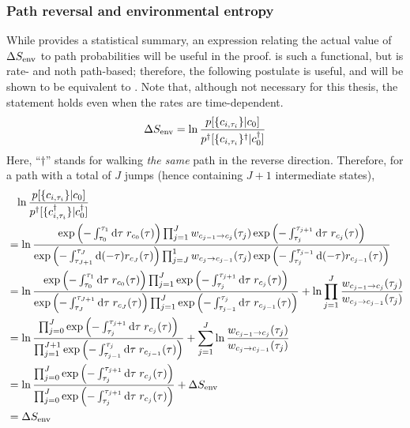 \subsubsection{Path reversal and environmental entropy}

While  provides a statistical summary, an expression relating the actual value of \(\Delta S_\text{env}\) to path probabilities will be useful in the proof.  is such a functional, but is rate- and noth path-based; therefore, the following postulate is useful, and will be shown to be equivalent to . Note that, although not necessary for this thesis, the statement holds even when the rates are time-dependent.
%
\begin{equation}
	\label{eqn:SEnv path functional}
	\Delta S_\text{env}
	= \ln\frac{p[\{c_{i,\tau_i}\}|c_0]}{p^\dagger[\{c_{i,\tau_i}\}^\dagger|c^\dagger_0]}
\end{equation}
%
Here, ``\(\dagger\)'' stands for walking \emph{the same} path in the reverse direction. Therefore, for a path with a total of \(J\) jumps (hence containing \(J+1\) intermediate states),
%
\begin{align*}
	&\phantom{=}
		\ln\frac{p[\{c_{i,\tau_i}\} | c_0]}{p^\dagger[\{c^\dagger_{i,\tau_i}\} | c_0^\dagger]}
	\\
	&=
		\ln\frac{
			\operatorname{exp}\left(-\int_{\tau_0}^{\tau_1}\mathrm{d}\tau\;r_{c_0}(\tau)\right)
			\prod_{j=1}^J
				w_{c_{j-1} \to c_j}(\tau_j)
				\operatorname{exp}\left(-\int_{\tau_j}^{\tau_{j+1}}\mathrm{d}\tau\;r_{c_j}(\tau)\right)
		}{
			\operatorname{exp}\left(-\int_{\tau_{J+1}}^{\tau_J}\mathrm{d}(-\tau)r_{c_J}(\tau)\right)
			\prod_{j=J}^1
				w_{c_j\to c_{j-1}}(\tau_j)
				\operatorname{exp}\left(-\int_{\tau_j}^{\tau_{j-1}}\mathrm{d}(-\tau)r_{c_{j-1}}(\tau)\right)
		}
	\\
	&=
		\ln\frac{
			\operatorname{exp}\left(-\int_{\tau_0}^{\tau_1}\mathrm{d}\tau\;r_{c_0}(\tau)\right)
			\prod_{j=1}^J
				\operatorname{exp}\left(-\int_{\tau_j}^{\tau_{j+1}}\mathrm{d}\tau\;r_{c_j}(\tau)\right)
		}{
			\operatorname{exp}\left(-\int_{\tau_J}^{\tau_{J+1}}\mathrm{d}\tau\;r_{c_J}(\tau)\right)
			\prod_{j=1}^J
				\operatorname{exp}\left(-\int_{\tau_{j-1}}^{\tau_j}\mathrm{d}\tau\;r_{c_{j-1}}(\tau)\right)
		}
		+ \ln\prod_{j=1}^J\frac{w_{c_{j-1}\to c_j}(\tau_j)}{w_{c_j\to c_{j-1}}(\tau_j)}
	\\
	&=
		\ln\frac{
			\prod_{j=0}^J
				\operatorname{exp}\left(-\int_{\tau_j}^{\tau_{j+1}}\mathrm{d}\tau\;r_{c_j}(\tau)\right)
		}{
			\prod_{j=1}^{J+1}
				\operatorname{exp}\left(-\int_{\tau_{j-1}}^{\tau_j}\mathrm{d}\tau\;r_{c_{j-1}}(\tau)\right)
		}
		+ \sum_{j=1}^J\ln\frac{w_{c_{j-1}\to c_j}(\tau_j)}{w_{c_j\to c_{j-1}}(\tau_j)}
	\\
	&=
		\ln\frac{
			\prod_{j=0}^J
				\operatorname{exp}\left(-\int_{\tau_j}^{\tau_{j+1}}\mathrm{d}\tau\;r_{c_j}(\tau)\right)
		}{
			\prod_{j=0}^J
				\operatorname{exp}\left(-\int_{\tau_j}^{\tau_{j+1}}\mathrm{d}\tau\;r_{c_j}(\tau)\right)
		}
		+ \Delta S_\text{env}
	\\
	&=
		\Delta S_\text{env}
\end{align*}
